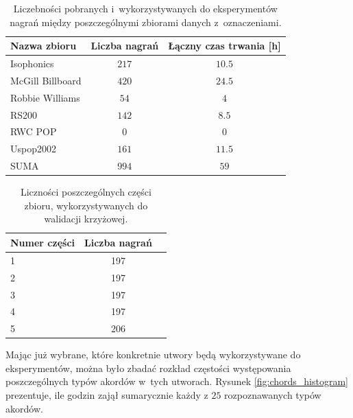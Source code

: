 \begin{table}
    \centering
    \caption{Liczebności pobranych i~wykorzystywanych do eksperymentów nagrań między poszczególnymi zbiorami danych z~oznaczeniami.}
    \label{tab:datasets2}
    \begin{tabular}{|l|c|c|}
        \hline
        Nazwa zbioru & Liczba nagrań & Łączny czas trwania [h] \\
        \hline
        Isophonics          & $217$ & $10.5$ \\ %
        McGill Billboard    & $420$ & $24.5$ \\ %
        Robbie Williams     & $54$  & $4$    \\ %
        RS200               & $142$ & $8.5$  \\ %
        RWC POP             & $0$   & $0$    \\
        Uspop2002           & $161$ & $11.5$ \\ %
        \hline
        SUMA                & $994$ & $59$   \\
        \hline
    \end{tabular}
\end{table}

\begin{table}
    \centering
    \caption{Liczności poszczególnych części zbioru, wykorzystywanych do walidacji krzyżowej.}
    \label{tab:datasets3}
    \begin{tabular}{|l|c|c|}
        \hline
        Numer części & Liczba nagrań \\
        \hline
        1  & 197 \\
        2  & 197 \\
        3  & 197 \\
        4  & 197 \\
        5  & 206 \\
        \hline
    \end{tabular}
\end{table}

Mając już wybrane, które konkretnie utwory będą wykorzystywane do eksperymentów, można było zbadać rozkład częstości występowania poszczególnych typów akordów w~tych utworach. Rysunek \ref{fig:chords_histogram} prezentuje, ile godzin zajął sumarycznie każdy z $25$ rozpoznawanych typów akordów.

